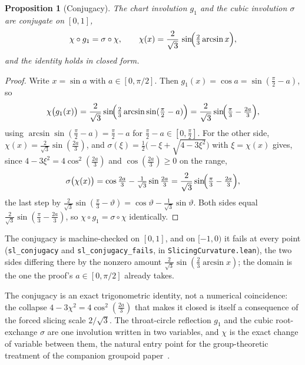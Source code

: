 \documentclass[11pt,a4paper]{article}
\newtheorem{proposition}[theorem]{Proposition}
\theoremstyle{definition}
\begin{document}
\begin{proposition}[Conjugacy]\label{prop:conjugacy}
The chart involution $g_{1}$ and the cubic involution $\sigma$ are conjugate on $[0,1]$,
\begin{equation}\label{eq:chi}
  \chi\circ g_{1}=\sigma\circ\chi,
  \qquad
  \chi(x)=\frac{2}{\sqrt3}\,\sin\!\Bigl(\tfrac{2}{3}\arcsin x\Bigr),
\end{equation}
and the identity holds in closed form.
\end{proposition}

\begin{proof}
Write $x=\sin a$ with $a\in[0,\pi/2]$. Then $g_{1}(x)=\cos a=\sin(\tfrac\pi2-a)$, so
\[
  \chi\bigl(g_{1}(x)\bigr)=\frac{2}{\sqrt3}\sin\!\Bigl(\tfrac23\arcsin\sin(\tfrac\pi2-a)\Bigr)
  =\frac{2}{\sqrt3}\sin\!\Bigl(\tfrac\pi3-\tfrac{2a}{3}\Bigr),
\]
using $\arcsin\sin(\tfrac\pi2-a)=\tfrac\pi2-a$ for $\tfrac\pi2-a\in[0,\tfrac\pi2]$. For the other side, $\chi(x)=\tfrac{2}{\sqrt3}\sin(\tfrac{2a}{3})$, and $\sigma(\xi)=\tfrac12\bigl(-\xi+\sqrt{4-3\xi^{2}}\bigr)$ with $\xi=\chi(x)$ gives, since $4-3\xi^{2}=4\cos^{2}(\tfrac{2a}{3})$ and $\cos(\tfrac{2a}{3})\ge0$ on the range,
\[
  \sigma\bigl(\chi(x)\bigr)=\cos\tfrac{2a}{3}-\tfrac{1}{\sqrt3}\sin\tfrac{2a}{3}
  =\frac{2}{\sqrt3}\sin\!\Bigl(\tfrac\pi3-\tfrac{2a}{3}\Bigr),
\]
the last step by $\tfrac{2}{\sqrt3}\sin(\tfrac\pi3-\vartheta)=\cos\vartheta-\tfrac{1}{\sqrt3}\sin\vartheta$. Both sides equal $\tfrac{2}{\sqrt3}\sin(\tfrac\pi3-\tfrac{2a}{3})$, so $\chi\circ g_{1}=\sigma\circ\chi$ identically.
\end{proof}

The conjugacy is machine-checked on $[0,1]$, and on $[-1,0)$ it fails at every point (\texttt{sl\_conjugacy} and \texttt{sl\_conjugacy\_fails}, in \texttt{SlicingCurvature.lean}), the two sides differing there by the nonzero amount $\tfrac{2}{\sqrt3}\sin(\tfrac23\arcsin x)$; the domain is the one the proof's $a\in[0,\pi/2]$ already takes.

The conjugacy is an exact trigonometric identity, not a numerical coincidence: the collapse $4-3\chi^{2}=4\cos^{2}(\tfrac{2a}{3})$ that makes it closed is itself a consequence of the forced slicing scale $2/\sqrt3$. The throat-circle reflection $g_{1}$ and the cubic root-exchange $\sigma$ are one involution written in two variables, and $\chi$ is the exact change of variable between them, the natural entry point for the group-theoretic treatment of the companion groupoid paper~\cite{JanzenGroupoid}.
\end{document}
